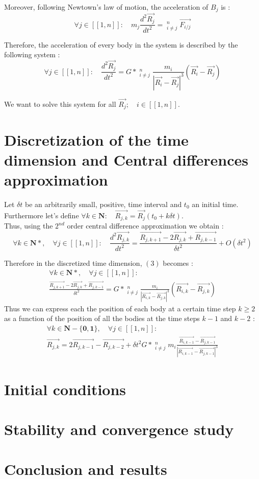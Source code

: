 \documentclass[a4paper,11pt]{article}
\begin{document}
Moreover, following Newtown's law of motion, the acceleration of $B_j$ is :
\begin{equation}
  \forall j \in [[1, n]]:\quad m_j \frac{d^2\vec{R_j}}{dt^2} =
  \mathop{\sum_{i=1}}_{i \ne j}^n \vec{F_{i/j}}
\end{equation}

Therefore, the acceleration of every body in the system is described by the following system :
\begin{equation}
  \forall j \in [[1, n]]:\quad \frac{d^2\vec{R_j}}{dt^2} =
  G*\mathop{\sum_{i=1}}_{i \ne j}^n \frac{m_i}{|{\vec{R_i} - \vec{R_j}}|^3} (\vec{R_i} - \vec{R_j})
\end{equation}

We want to solve this system for all $\vec{R_j}; \quad i \in [[1, n]]$.

\section{Discretization of the time dimension and Central differences approximation}
Let $\delta t$ be an arbitrarily small, positive, time interval and $t_0$ an initial time.
Furthermore let's define $\forall k \in \mathbf{N}:\quad \vec{R_{j,k}} = \vec{R_j}(t_0+k\delta t)$.\\
Thus, using the $2^{nd}$ order central difference approximation we obtain :
\begin{equation}
  \forall k \in \mathbf{N*},\quad \forall j \in [[1, n]]:\quad
  \frac{d^2\vec{R_{j,k}}}{dt^2} = \frac{\vec{R_{j,k+1}} - 2 \vec{R_{j,k}} + \vec{R_{j,k-1}}}{\delta t^2}+ O(\delta t^2)
\end{equation}

Therefore in the discretized time dimension, $(3)$ becomes :
\begin{multline}
  \forall k \in \mathbf{N*},\quad \forall j \in [[1, n]]:\\
  \frac{\vec{R_{j,k+1}} - 2 \vec{R_{j,k}} + \vec{R_{j,k-1}}}{\delta t^2} = 
  G*\mathop{\sum_{i=1}}_{i \ne j}^n \frac{m_i}{|{\vec{R_{i,k}} - \vec{R_{j,k}}}|^3}
  (\vec{R_{i,k}} - \vec{R_{j,k}})
\end{multline}
Thus we can express each the position of each body at a certain time step $k \ge 2$
as a function of the position of all the bodies at the time steps $k - 1$ and $k - 2$ :
\begin{multline}
  \forall k \in \mathbf{N-\{0,1\}},\quad \forall j \in [[1, n]]:\\
  \vec{R_{j,k}} = 2 \vec{R_{j,k-1}} - \vec{R_{j,k-2}} +
  \delta t^2 G* \mathop{\sum_{i=1}}_{i \ne j}^n m_i
  \frac{\vec{R_{i,k-1}} - \vec{R_{j,k-1}}}{|{\vec{R_{i,k-1}} - \vec{R_{j,k-1}}}|^3}
\end{multline}
\section{Initial conditions}
\section{Stability and convergence study}
\section{Conclusion and results}
\end{document}
